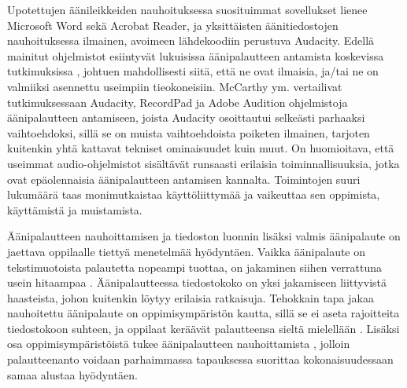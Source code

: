 \documentclass[utf8]{gradu3}
\begin{document}
Upotettujen äänileikkeiden nauhoituksessa suosituimmat sovellukset lienee Microsoft Word sekä Acrobat Reader, ja yksittäisten äänitiedostojen nauhoituksessa ilmainen, avoimeen lähdekoodiin perustuva Audacity. Edellä mainitut ohjelmistot esiintyvät lukuisissa äänipalautteen antamista koskevissa tutkimuksissa \parencite{using, ice, principles, evaluating, areYouListening, engaging, academics, attitudes, versus}, johtuen mahdollisesti siitä, että ne ovat ilmaisia, ja/tai ne on valmiiksi asennettu useimpiin tieokoneisiin. McCarthy ym. \parencite*{evaluating} vertailivat tutkimuksessaan Audacity, RecordPad ja Adobe Audition ohjelmistoja äänipalautteen antamiseen, joista Audacity osoittautui selkeästi parhaaksi vaihtoehdoksi, sillä se on muista vaihtoehdoista poiketen ilmainen, tarjoten kuitenkin yhtä kattavat tekniset ominaisuudet kuin muut. On huomioitava, että useimmat audio-ohjelmistot sisältävät runsaasti erilaisia toiminnallisuuksia, jotka ovat epäolennaisia äänipalautteen antamisen kannalta. Toimintojen suuri lukumäärä taas monimutkaistaa käyttöliittymää ja vaikeuttaa sen oppimista, käyttämistä ja muistamista.

Äänipalautteen nauhoittamisen ja tiedoston luonnin lisäksi valmis äänipalaute on jaettava oppilaalle tiettyä menetelmää hyödyntäen. Vaikka äänipalaute on tekstimuotoista palautetta nopeampi tuottaa, on jakaminen siihen verrattuna usein hitaampaa \parencite{evaluating}. Äänipalautteessa tiedostokoko on yksi jakamiseen liittyvistä haasteista, johon kuitenkin löytyy erilaisia ratkaisuja. Tehokkain tapa jakaa nauhoitettu äänipalaute on oppimisympäristön kautta, sillä se ei aseta rajoitteita tiedostokoon suhteen, ja oppilaat keräävät palautteensa sieltä mielellään \parencite{areYouListening}. Lisäksi osa oppimisympäristöistä tukee äänipalautteen nauhoittamista \parencite{using}, jolloin palautteenanto voidaan parhaimmassa tapauksessa suorittaa kokonaisuudessaan samaa alustaa hyödyntäen. 
\end{document}
